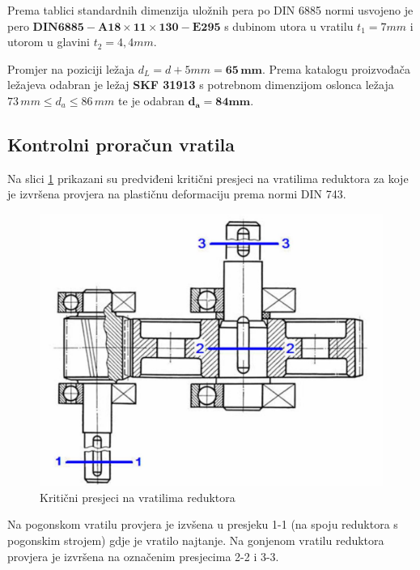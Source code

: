 \documentclass[11pt,a4paper]{report}
\begin{document}
Prema tablici standardnih dimenzija uložnih pera\cite{potrebniMaterijali} po DIN 6885 normi usvojeno je pero $\mathbf{DIN6885-A 18 \times 11 \times 130-E295}$ s dubinom utora u vratilu $t_1=7mm$ i utorom u glavini $t_2=4,4mm$.

Promjer na poziciji ležaja $d_L=d+5mm= \mathbf{65 \,mm}$.
Prema katalogu proizvođača ležajeva\cite{skf} odabran je ležaj \textbf{SKF 31913} s potrebnom dimenzijom oslonca ležaja $73 \, mm \leq d_a \leq 86 \, mm$ te je odabran $\mathbf{d_a=84mm}$.

\subsection{Kontrolni proračun vratila}
Na slici \ref{fig:kriticniPresjeci} prikazani su predviđeni kritični presjeci na vratilima reduktora za koje je izvršena provjera na plastičnu deformaciju prema normi DIN 743.
\begin{figure}[!h]
\includegraphics[width=1\textwidth]{KriticniPresjeci.jpg}
\caption{Kritični presjeci na vratilima reduktora}\label{fig:kriticniPresjeci}
\end{figure}

Na pogonskom vratilu provjera je izvšena u presjeku 1-1 (na spoju reduktora s pogonskim strojem) gdje je vratilo najtanje.
Na gonjenom vratilu reduktora provjera je izvršena na označenim presjecima 2-2 i 3-3.
\end{document}
